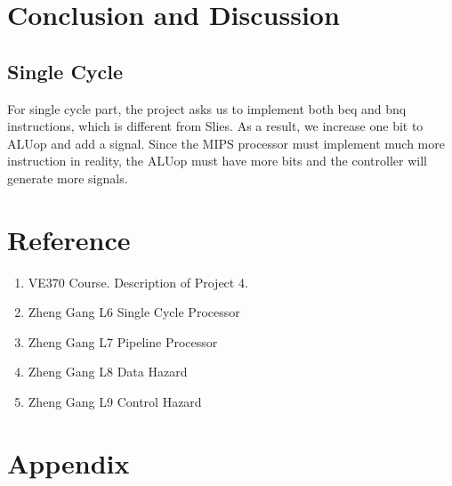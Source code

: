 \documentclass[12pt]{article}
\begin{document}
\section{Conclusion and Discussion}
\subsection{Single Cycle}
For single cycle part, the project asks us to implement both beq and bnq instructions, which is different from Slies. As a result, we increase one bit to ALUop and add a signal. Since the MIPS processor must implement much more instruction in reality, the ALUop must have more bits and the controller will generate more signals.
\section{Reference}
\begin{enumerate}[-]
\item VE370 Course. Description of Project 4.
\item Zheng Gang L6 Single Cycle Processor
\item Zheng Gang L7 Pipeline Processor
\item Zheng Gang L8 Data Hazard
\item Zheng Gang L9 Control Hazard
\end{enumerate}
\section{Appendix}
\end{document}
